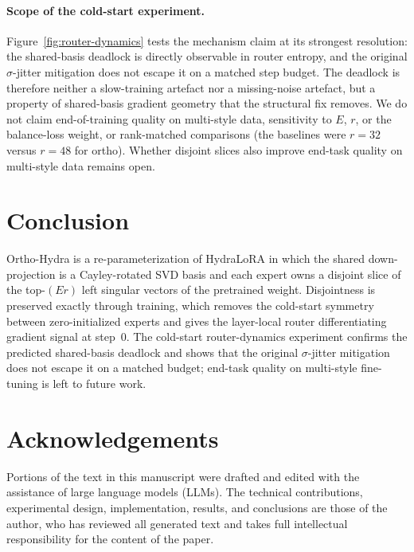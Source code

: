 \documentclass[10pt]{article}
\begin{document}
\paragraph{Scope of the cold-start experiment.}
Figure~\ref{fig:router-dynamics} tests the mechanism claim at its
strongest resolution: the shared-basis deadlock is directly
observable in router entropy, and the original $\sigma$-jitter
mitigation does not escape it on a matched step budget. The deadlock
is therefore neither a slow-training artefact nor a missing-noise
artefact, but a property of shared-basis gradient geometry that the
structural fix removes. We do not claim end-of-training quality on
multi-style data, sensitivity to $E$, $r$, or the balance-loss
weight, or rank-matched comparisons (the baselines were $r\!=\!32$
versus $r\!=\!48$ for ortho). Whether disjoint slices also improve
end-task quality on multi-style data remains open.

\section{Conclusion}

Ortho-Hydra is a re-parameterization of HydraLoRA in which the
shared down-projection is a Cayley-rotated SVD basis and each expert
owns a disjoint slice of the top-$(Er)$ left singular vectors of the
pretrained weight. Disjointness is preserved exactly through training,
which removes the cold-start symmetry between zero-initialized experts
and gives the layer-local router differentiating gradient signal at
step~$0$. The cold-start router-dynamics experiment
confirms the predicted shared-basis deadlock and shows that the
original $\sigma$-jitter mitigation does not escape it on a matched
budget; end-task quality on multi-style fine-tuning is left to future
work.

\section*{Acknowledgements}

Portions of the text in this manuscript were drafted and edited with
the assistance of large language models (LLMs). The technical
contributions, experimental design, implementation, results, and
conclusions are those of the author, who has reviewed all generated
text and takes full intellectual responsibility for the content of
the paper.

\small
\end{document}
